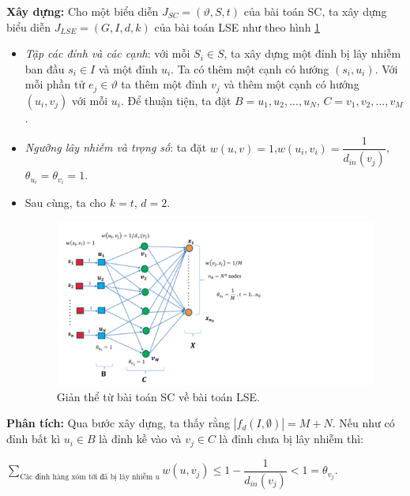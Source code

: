  	{\bfseries Xây dựng:} Cho một biểu diễn $J_{SC} = (\vartheta, S, t)$ của bài toán SC, ta xây dựng biểu diễn $J_{LSE} = (G, I, d, k)$ của bài toán LSE như theo hình \ref{refhinh3_3}
 	\begin {itemize}
 	\item {\itshape Tập các đỉnh và các cạnh}: với mỗi $S_{i} \in S$, ta xây dựng một đỉnh bị lây nhiễm ban đầu $s_{i} \in I$ và một đỉnh $u_{i}$. Ta có thêm một cạnh có hướng $(s_{i}, u_{i})$. Với mỗi phần tử $e_{j} \in \vartheta$ ta thêm một đỉnh $v_{j}$ và thêm một cạnh có hướng $(u_{i},v_{j})$ với mỗi $u_{i}$. Để thuận tiện, ta đặt $B = {u_{1}, u_{2}, ... , u_{N}}$, $C = {v_{1}, v_{2}, ... , v_{M}}$.
 	
 	\item {\itshape Ngưỡng lây nhiễm và trọng số}: ta đặt $w(u,v) = 1$,\linebreak $w(u_{i}, v_{i}) = \dfrac{1}{d_{in}(v_{j})}$, $\theta_{u_{i}} = \theta_{v_{i}} = 1$.
 	
 	\item Sau cùng, ta cho $k = t$, $d = 2$. 		
 	
 	\begin{center}
 		\begin{figure}[H]
 			\begin{center}
 				\includegraphics [scale=1]{picture/Hinh3_3}
 			\end{center}
 			\caption{Giản thể từ bài toán SC về bài toán LSE.}
 			\label{refhinh3_3}
 		\end{figure}
 	\end{center}
 	\end {itemize}
 	{\bfseries Phân tích:} Qua bước xây dựng, ta thấy rằng $| f_{d}(I,\emptyset) | = M + N$. Nếu như có đỉnh bất kì $u_{i} \in B$ là đỉnh kề vào và $v_{j} \in C$ là đỉnh chưa bị lây nhiễm thì: 
 	\begin{center}
 		$\sum_{\text{Các đỉnh hàng xóm tới đã bị lây nhiễm $u$}} w(u, v_{j}) \leq 1 - \dfrac{1}{d_{in}(v_{j})} < 1 = \theta_{v_{j}}$.
 	\end{center}
 	
